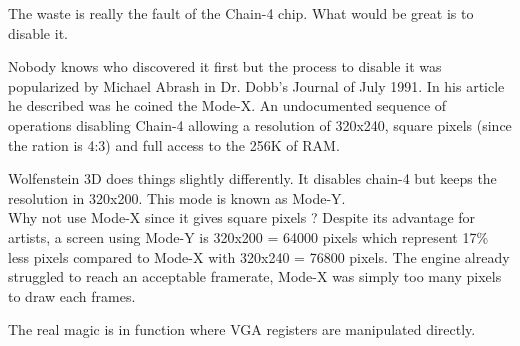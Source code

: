\documentclass[book.tex]{subfiles}
\begin{document}
 \par
 The waste is really the fault of the Chain-4 chip. What would be great is to disable it.\\
 \par
Nobody knows who discovered it first but the process to disable it was popularized by Michael Abrash in Dr. Dobb's Journal of July 1991. In his article he described was he coined the Mode-X. An undocumented sequence of operations disabling Chain-4 allowing a resolution of 320x240, square pixels (since the ration is 4:3) and full access to the 256K of RAM.\\
 \par
 Wolfenstein 3D does things slightly differently. It disables chain-4 but keeps the resolution in 320x200. This mode is known as Mode-Y. \\
  Why not use Mode-X since it gives square pixels ? Despite its advantage for artists, a screen using Mode-Y is 320x200 = 64000 pixels which represent 17\% less pixels compared to Mode-X with 320x240 = 76800 pixels. The engine already struggled to reach an acceptable framerate, Mode-X was simply too many pixels to draw each frames.\\
 \par
{}
 \par
  \begin{minipage}{\textwidth}

\end{minipage}
 \par

The real magic is in function  where VGA registers are manipulated directly. \\
\end{document}
